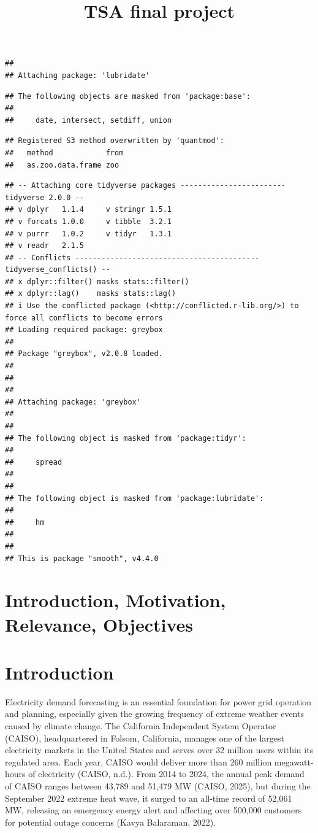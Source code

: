 \documentclass[
]{article}
\title{TSA final project}
\author{}
\date{\vspace{-2.5em}}
\begin{document}
\maketitle

\begin{verbatim}
## 
## Attaching package: 'lubridate'
\end{verbatim}

\begin{verbatim}
## The following objects are masked from 'package:base':
## 
##     date, intersect, setdiff, union
\end{verbatim}

\begin{verbatim}
## Registered S3 method overwritten by 'quantmod':
##   method            from
##   as.zoo.data.frame zoo
\end{verbatim}

\begin{verbatim}
## -- Attaching core tidyverse packages ------------------------ tidyverse 2.0.0 --
## v dplyr   1.1.4     v stringr 1.5.1
## v forcats 1.0.0     v tibble  3.2.1
## v purrr   1.0.2     v tidyr   1.3.1
## v readr   2.1.5     
## -- Conflicts ------------------------------------------ tidyverse_conflicts() --
## x dplyr::filter() masks stats::filter()
## x dplyr::lag()    masks stats::lag()
## i Use the conflicted package (<http://conflicted.r-lib.org/>) to force all conflicts to become errors
## Loading required package: greybox
## 
## Package "greybox", v2.0.8 loaded.
## 
## 
## 
## Attaching package: 'greybox'
## 
## 
## The following object is masked from 'package:tidyr':
## 
##     spread
## 
## 
## The following object is masked from 'package:lubridate':
## 
##     hm
## 
## 
## This is package "smooth", v4.4.0
\end{verbatim}

\section{Introduction, Motivation, Relevance,
Objectives}\label{introduction-motivation-relevance-objectives}

\section{Introduction}\label{introduction}

Electricity demand forecasting is an essential foundation for power grid
operation and planning, especially given the growing frequency of
extreme weather events caused by climate change. The California
Independent System Operator (CAISO), headquartered in Folsom,
California, manages one of the largest electricity markets in the United
States and serves over 32 million users within its regulated area. Each
year, CAISO would deliver more than 260 million megawatt-hours of
electricity (CAISO, n.d.). From 2014 to 2024, the annual peak demand of
CAISO ranges between 43,789 and 51,479 MW (CAISO, 2025), but during the
September 2022 extreme heat wave, it surged to an all-time record of
52,061 MW, releasing an emergency energy alert and affecting over
500,000 customers for potential outage concerns (Kavya Balaraman, 2022).
\end{document}
